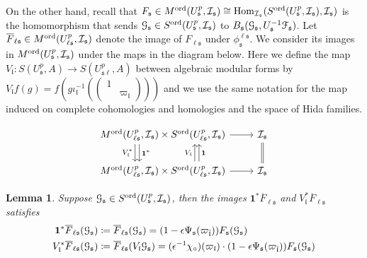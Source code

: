 \documentclass[leqno]{amsart}
\newtheorem{lem}[thm]{Lemma}
\theoremstyle{definition}
\theoremstyle{remark}
\newcommand{\smat}[1]{\left(\begin{smallmatrix} #1 \end{smallmatrix}\right)}
\newcommand{\id}{\mathbf{1}}
\DeclareMathOperator{\Hom}{Hom}
\newcommand{\fl}{\mathfrak{l}}
\newcommand{\fs}{\mathfrak{s}}
\newcommand{\euF}{\EuScript{F}} %
\newcommand{\I}{\mathcal{I}} %
\newcommand{\ord}{\textnormal{ord}} %
\begin{document}
On the other hand, recall that 
$F_{\fs}\in M^{\ord}(U^p_\fs,\I_\fs)\cong
\Hom_{\I_\fs}(S^{\ord}(U^p_\fs,\I_\fs),\I_\fs)$
is the homomorphism that sends
$\EuScript{G}_\fs\in S^{\ord}(U^p_\fs,\I_\fs)$
to $B_\fs(\EuScript{G}_\fs, U_\fs^{-1}\euF_{\fs})$.
Let $\overline{F}_{\ell\fs}\in M^{\ord}(U^p_{\ell\fs},\I_\fs)$
denote the image of $F_{\ell\fs}$ under $\phi^{\ell\fs}_\fs$.
We consider its images in $M^{\ord}(U^p_\fs,\I_\fs)$
under the maps in the diagram below.
Here we define the map
$V_\fl\colon S(U^p_\fs,A)\to S(U^p_{\fs\ell},A)$
between algebraic modular forms by
$V_\fl f(g)=f(g\iota_\fl^{-1}(\smat{1&\\&\varpi_\fl}))$
and we use the same notation
for the map induced on
complete cohomologies and homologies
and the space of Hida families.


\[
\begin{tikzcd}
M^{\ord}(U^p_{\ell\fs},\I_\fs) 
\arrow[d, shift right=6.5ex, "V_\fl^*",swap]
\arrow[d, shift right=5.5ex, "\id^*"]
\times  S^{\ord}(U^p_{\ell\fs},\I_\fs) 
\arrow[r] &
\I_\fs \arrow[d,equal]\\
M^{\ord}(U^p_{\ell\fs},\I_\fs) \times
S^{\ord}(U^p_{\ell\fs},\I_\fs)
\arrow[u, shift right=7.5ex, "V_\fl"]
\arrow[u, shift right=8.5ex, "\id",swap]
\arrow[r] & \I_\fs
\end{tikzcd}
\]

\begin{lem}
Suppose $\EuScript{G}_{\fs}\in 
S^{\ord}(U^p_{\fs},\I_{\fs})$,
then the images 
$\id^*\overline{F}_{\ell\fs}$ and
$V_\fl^*\overline{F}_{\ell\fs}$ satisfies
\begin{align*}
\id^*\overline{F}_{\ell\fs}(\EuScript{G}_{\fs})&
\coloneqq \overline{F}_{\ell\fs}(\EuScript{G}_{\fs})=
(1-\epsilon\Psi_{\fs}(\varpi_{\bar{\fl}}))
F_{\fs}(\EuScript{G}_{\fs}) \\
V_\fl^*\overline{F}_{\ell\fs}(\EuScript{G}_{\fs})&
\coloneqq \overline{F}_{\ell\fs}(V_\fl\EuScript{G}_{\fs})=
(\epsilon^{-1}\chi_\circ)(\varpi_\fl)\cdot 
(1-\epsilon\Psi_{\fs}(\varpi_{\bar{\fl}}))
F_{\fs}(\EuScript{G}_{\fs})
\end{align*}
\end{lem}
\end{document}
